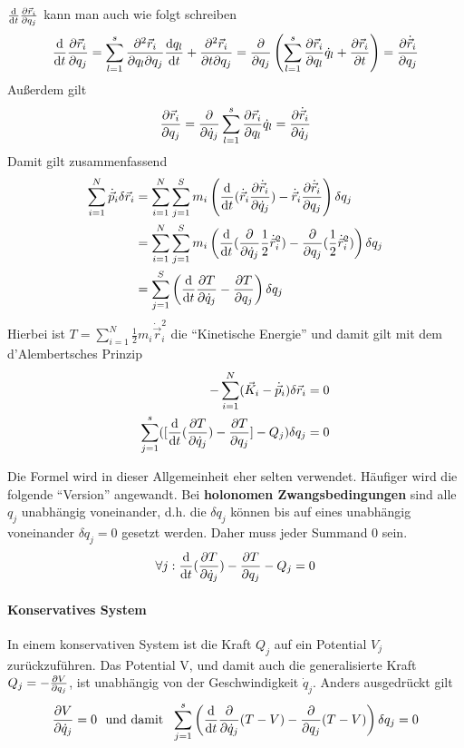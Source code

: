 $\frac{\mathrm d}{\mathrm d t} \frac{\partial \vec{r}_i}{\partial q_j}$ kann man auch wie folgt schreiben 
$$\frac{\mathrm d}{\mathrm d t} \frac{\partial \vec{r}_i}{\partial q_j} = \sum_{l=1}^s \frac{\partial^2 \vec{r}_i}{\partial q_l \partial q_j} \frac{\mathrm d q_l}{\mathrm d t} + \frac{\partial^2 \vec{r}_i}{\partial t \partial q_j} = \frac{\partial}{\partial q_j} \left( \sum_{l=1}^s \frac{\partial \vec{r}_i}{\partial q_l} \dot{q}_l + \frac{\partial \vec{r}_i}{\partial t}\right) = \frac{\partial \dot{\vec{r}}_i}{\partial q_j}$$
Außerdem gilt
$$\frac{\partial \vec{r}_i}{\partial q_j} = \frac{\partial}{\partial \dot q_j} \sum_{l = 1}^s \frac{\partial \vec{r}_i}{\partial q_l} \dot{q}_l = \frac{\partial \dot{\vec{r}}_i}{\partial \dot{q}_j}$$
Damit gilt zusammenfassend
\begin{align*}
\sum_{i = 1}^N \dot{\vec{p}}_i \delta \vec{r}_i &= \sum_{i=1}^N \sum_{j = 1}^S m_i \left( \frac{\mathrm d}{\mathrm d t} (\dot{\vec{r}}_i  \frac{\partial \dot{\vec{r}}_i}{\partial \dot{q}_j})  -\dot{\vec{r}}_i \frac{\partial \dot{\vec{r}}_i}{\partial q_j} \right) \delta q_j\\ 
&= \sum_{i=1}^N\sum_{j=1}^S m_i \left(  \frac{\mathrm d}{\mathrm d t} (\frac{\partial}{\partial \dot q_j} \frac12 \dot{\vec{r}}_i^2) -\frac{\partial}{\partial q_j} (\frac12 \dot{\vec{r}}_i^2) \right) \delta q_j \\
&= \sum_{j = 1}^S \left( \frac{\mathrm d}{\mathrm d t} \frac{\partial T}{\partial \dot{q}_j} - \frac{\partial T}{\partial q_j} \right) \delta q_j
\end{align*}
Hierbei ist $T = \sum_{i = 1}^{N} \frac12 m_i \dot{\vec{r}}_i^2$ die "`Kinetische Energie"'
und damit gilt mit dem d'Alembertsches Prinzip
\begin{align*}
- \sum_{i = 1}^{N} (\vec{K}_i - \dot{\vec{p}}_i) \delta \vec{r}_i &= 0\\
\sum_{j = 1}^s( [\frac{\mathrm d}{\mathrm d t} ( \frac{\partial T}{\partial \dot{q}_j}) - \frac{\partial T}{\partial q_j}] - Q_j ) \delta q_j &= 0
\end{align*}

Die Formel wird in dieser Allgemeinheit eher selten verwendet. Häufiger wird die folgende "`Version"' angewandt. Bei \textbf{holonomen Zwangsbedingungen} sind alle $q_j$ unabhängig voneinander, d.h. die $\delta q_j$  können bis auf eines unabhängig voneinander $\delta q_j = 0$ gesetzt werden. Daher muss jeder Summand 0 sein.
$$\forall j:  \frac{\mathrm d}{\mathrm d t} ( \frac{\partial T}{\partial \dot{q}_j}) - \frac{\partial T}{\partial q_j} - Q_j = 0$$

\paragraph{Konservatives System}
In einem konservativen System ist die Kraft $Q_j$ auf ein Potential $V_j$ zurückzuführen. Das Potential V, und damit auch die generalisierte Kraft $Q_j = - \frac{\partial V}{\partial q_j}$, ist unabhängig von der Geschwindigkeit $\dot{q}_j$. Anders ausgedrückt gilt
$$\frac{\partial V}{\partial \dot q_j} = 0 \text{~ und damit ~} \sum_{j=1}^s \left(  \frac{\mathrm d}{\mathrm d t} \frac{\partial}{\partial \dot{q}_j} (T-V) - \frac{\partial}{\partial q_j} (T -V) \right) \delta q_j = 0$$


